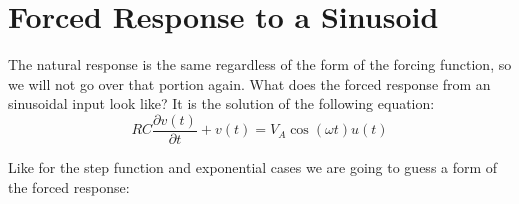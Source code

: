 \documentclass{handout}
\begin{document}
\newpage
\clearpage
\pagebreak


\newpage
\clearpage
\pagebreak

\section{Forced Response to a Sinusoid}
The natural response is the same regardless of the form of the forcing function, so we will not go over that portion again.  What does the forced response from an sinusoidal input look like?  It is the solution of the following equation:
\[
RC\frac{\partial v(t)}{\partial t}+v(t) = V_A\cos (\omega t)u(t)
\]

Like for the step function and exponential cases we are going to guess a form of the forced response:
\soln{0.75in}{
\[
v_F(t) = a\cos (\omega t) +b \sin (\omega t)
\]
}
\end{document}
